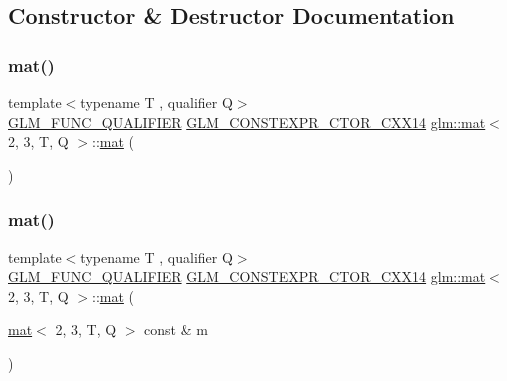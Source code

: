 \subsection{Constructor \& Destructor Documentation}
\mbox{\label{structglm_1_1mat_3_012_00_013_00_01_t_00_01_q_01_4_a895bbb293e0af4e6f3fdc032e736e4eb}} 
\subsubsection{\texorpdfstring{mat()}{mat()}\hspace{0.1cm}{\footnotesize\ttfamily [1/21]}}
{\footnotesize\ttfamily template$<$typename T , qualifier Q$>$ \\
\mbox{\hyperlink{setup_8hpp_a33fdea6f91c5f834105f7415e2a64407}{G\+L\+M\+\_\+\+F\+U\+N\+C\+\_\+\+Q\+U\+A\+L\+I\+F\+I\+ER}} \mbox{\hyperlink{setup_8hpp_a0900f9145e68bf6061b6f5e7be3fa751}{G\+L\+M\+\_\+\+C\+O\+N\+S\+T\+E\+X\+P\+R\+\_\+\+C\+T\+O\+R\+\_\+\+C\+X\+X14}} \mbox{\hyperlink{structglm_1_1mat}{glm\+::mat}}$<$ 2, 3, T, Q $>$\+::\mbox{\hyperlink{structglm_1_1mat}{mat}} (\begin{DoxyParamCaption}{ }\end{DoxyParamCaption})}

\mbox{\label{structglm_1_1mat_3_012_00_013_00_01_t_00_01_q_01_4_a6b574b8414d3902192ded677b5476562}} 
\subsubsection{\texorpdfstring{mat()}{mat()}\hspace{0.1cm}{\footnotesize\ttfamily [2/21]}}
{\footnotesize\ttfamily template$<$typename T , qualifier Q$>$ \\
\mbox{\hyperlink{setup_8hpp_a33fdea6f91c5f834105f7415e2a64407}{G\+L\+M\+\_\+\+F\+U\+N\+C\+\_\+\+Q\+U\+A\+L\+I\+F\+I\+ER}} \mbox{\hyperlink{setup_8hpp_a0900f9145e68bf6061b6f5e7be3fa751}{G\+L\+M\+\_\+\+C\+O\+N\+S\+T\+E\+X\+P\+R\+\_\+\+C\+T\+O\+R\+\_\+\+C\+X\+X14}} \mbox{\hyperlink{structglm_1_1mat}{glm\+::mat}}$<$ 2, 3, T, Q $>$\+::\mbox{\hyperlink{structglm_1_1mat}{mat}} (\begin{DoxyParamCaption}\item[{\mbox{\hyperlink{structglm_1_1mat}{mat}}$<$ 2, 3, T, Q $>$ const \&}]{m }\end{DoxyParamCaption})}


